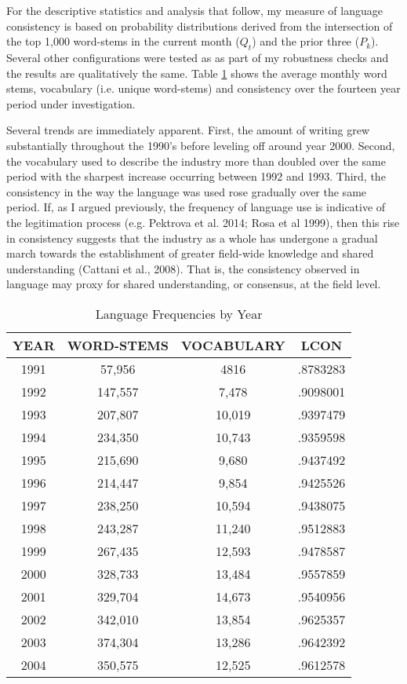 For the descriptive statistics and analysis that follow, my measure of language consistency is based on probability distributions derived from the intersection of the top 1,000 word-stems in the current month ($Q_t$) and the prior three ($P_k$). Several other configurations were tested as as part of my robustness checks and the results are qualitatively the same. Table \ref{freq} shows the average monthly word stems, vocabulary (i.e. unique word-stems) and consistency over the fourteen year period under investigation.

Several trends are immediately apparent. First, the amount of writing grew substantially throughout the 1990's before leveling off around year 2000. Second, the vocabulary used to describe the industry more than doubled over the same period with the sharpest increase occurring between 1992 and 1993. Third, the consistency in the way the language was used rose gradually over the same period. If, as I argued previously, the frequency of language use is indicative of the legitimation process (e.g. Pektrova et al. 2014; Rosa et al 1999), then this rise in consistency suggests that the industry as a whole has undergone a gradual march towards the establishment of greater field-wide knowledge and shared understanding (Cattani et al., 2008). That is, the consistency observed in language may proxy for shared understanding, or consensus, at the field level.

\begin{table}
\begin{center}
\caption[Language Frequencies by Year]{Language Frequencies by Year \label{freq}}
\vspace{0.3in}
\begin{tabular}{cccc}
\hline 
\hline
YEAR & WORD-STEMS & VOCABULARY & LCON \\
\hline
1991 & 57,956 & 4816 & .8783283 \\
1992	 & 147,557 & 7,478 & .9098001 \\
1993 &  207,807 & 10,019 & .9397479 \\
1994 &  234,350 & 10,743 & .9359598 \\
1995 &  215,690 & 9,680 & .9437492 \\
1996 &  214,447 & 9,854 & .9425526 \\
1997 &  238,250 & 10,594 & .9438075 \\
1998 &  243,287 & 11,240 & .9512883 \\
1999 &  267,435 & 12,593 & .9478587 \\
2000 &  328,733 & 13,484 & .9557859 \\
2001 &  329,704 & 14,673 & .9540956 \\
2002 &  342,010 & 13,854 & .9625357 \\
2003 &  374,304 & 13,286 & .9642392 \\
2004 &  350,575 & 12,525 & .9612578 \\
\hline
\end{tabular}
\end{center}
\end{table}



